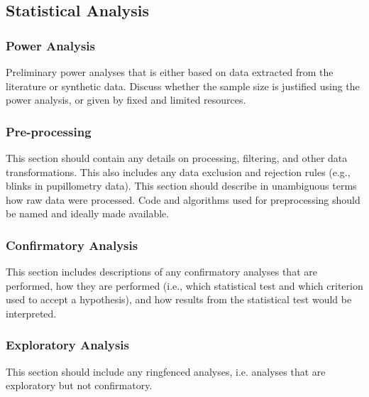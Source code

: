 \subsection{Statistical Analysis}

\subsubsection{Power Analysis}
\begin{prereg}
\begin{instruction}
Preliminary power analyses that is either based on data extracted from the literature or synthetic data. Discuss whether the sample size is justified using the power analysis, or given by fixed and limited resources.
\end{instruction}
\end{prereg}


\subsubsection{Pre-processing}
\begin{prereg}
\begin{instruction} 
This section should contain any details on processing, filtering, and other data transformations. This also includes any data exclusion and rejection rules (e.g., blinks in pupillometry data). This section should describe in unambiguous terms how raw data were processed. Code and algorithms used for preprocessing should be named and ideally made available.
\end{instruction}
\end{prereg}


\subsubsection{Confirmatory Analysis}
\begin{prereg}
\begin{instruction}
This section includes descriptions of any confirmatory analyses that are performed, how they are performed (i.e., which statistical test and which criterion used to accept a hypothesis), and how results from the statistical test would be interpreted. 
\end{instruction}
\end{prereg}




\subsubsection{Exploratory Analysis}
\begin{prereg}
\begin{instruction}
This section should include any ringfenced analyses, i.e. analyses that are exploratory but not confirmatory. 
\end{instruction}
\end{prereg}


